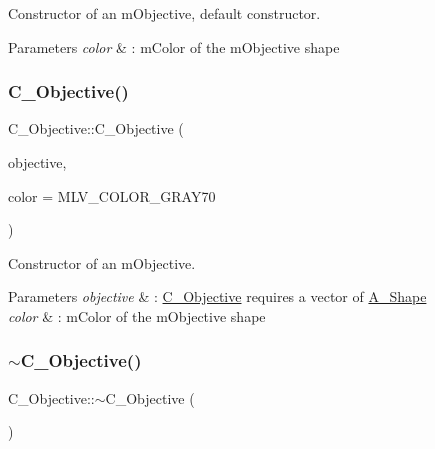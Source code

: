 Constructor of an m\+Objective, default constructor. 


\begin{DoxyParams}{Parameters}
{\em color} & \+: m\+Color of the m\+Objective shape \\
\hline
\end{DoxyParams}
\mbox{\label{classC__Objective_ae92eb6210a460fa7b551651584790ac8}} 
\subsubsection{\texorpdfstring{C\+\_\+\+Objective()}{C\_Objective()}\hspace{0.1cm}{\footnotesize\ttfamily [2/4]}}
{\footnotesize\ttfamily C\+\_\+\+Objective\+::\+C\+\_\+\+Objective (\begin{DoxyParamCaption}\item[{const std\+::vector$<$ std\+::shared\+\_\+ptr$<$ \hyperlink{classA__Shape}{A\+\_\+\+Shape} $>$$>$ \&}]{objective,  }\item[{M\+L\+V\+\_\+\+Color}]{color = {\ttfamily MLV\+\_\+COLOR\+\_\+GRAY70} }\end{DoxyParamCaption})\hspace{0.3cm}{\ttfamily [explicit]}}



Constructor of an m\+Objective. 


\begin{DoxyParams}{Parameters}
{\em objective} & \+: \hyperlink{classC__Objective}{C\+\_\+\+Objective} requires a vector of \hyperlink{classA__Shape}{A\+\_\+\+Shape} \\
\hline
{\em color} & \+: m\+Color of the m\+Objective shape \\
\hline
\end{DoxyParams}
\mbox{\label{classC__Objective_a4e05cb06acbee6d49734e2696cd419e9}} 
\subsubsection{\texorpdfstring{$\sim$\+C\+\_\+\+Objective()}{~C\_Objective()}\hspace{0.1cm}{\footnotesize\ttfamily [2/2]}}
{\footnotesize\ttfamily C\+\_\+\+Objective\+::$\sim$\+C\+\_\+\+Objective (\begin{DoxyParamCaption}{ }\end{DoxyParamCaption})}




